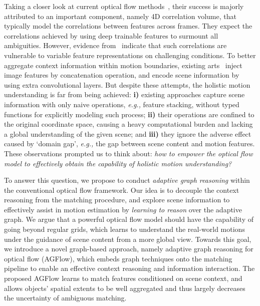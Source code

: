 \documentclass[letterpaper]{article} %
\begin{document}
Taking a closer look at current optical flow methods~\cite{Sun2018PWCNetCF, Yang2019VolumetricCN}, their success is majorly attributed to an important component, namely 4D correlation volume, that typically model the correlations between features across frames. They expect the correlations achieved by using deep trainable features to surmount all ambiguities. However, evidence from~\cite{Teed2020RAFTRA} indicate that such correlations are vulnerable to variable feature representations on challenging conditions. To better aggregate context information within motion boundaries, existing arts~\cite{Teed2020RAFTRA,Jiang2021LearningOF} inject image features by concatenation operation, and encode scene information by using extra convolutional layers. But despite these attempts, the holistic motion understanding is far from being achieved: {\bfseries i)} existing approaches capture scene information with only naive operations, \emph{e.g.,} feature stacking, without typed functions for explicitly modeling such process; {\bfseries ii)} their operations are confined to the original coordinate space, causing a heavy computational burden and lacking a global understanding of the given scene; and {\bfseries iii)} they ignore the adverse effect caused by `domain gap', \emph{e.g.,} the gap between scene content and motion features. These observations prompted us to think about: \emph{how to empower the optical flow model to effectively obtain the capability of holistic motion understanding?}

To answer this question, we propose to conduct \emph{adaptive graph reasoning} within the conventional optical flow framework. Our idea is to decouple the context reasoning from the matching procedure, and explore scene information to effectively assist in motion estimation by \emph{learning to reason} over the adaptive graph. We argue that a powerful optical flow model should have the capability of going beyond regular grids, which learns to understand the real-world motions under the guidance of scene content from a more global view. Towards this goal, we introduce a novel graph-based approach, namely adaptive graph reasoning for optical flow (AGFlow), which embeds graph techniques onto the matching pipeline to enable an effective context reasoning and information interaction. The proposed AGFlow learns to match features conditioned on scene context, and allows objects' spatial extents to be well aggregated and thus largely decreases the uncertainty of ambiguous matching.
\end{document}
